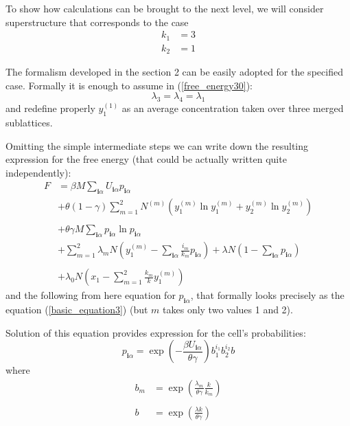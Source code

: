 \documentclass[12pt,abstract]{scrartcl}
\let\ce\ch
\begin{document}
To show how calculations can be brought to the next level, we will consider superstructure \ce{Cu3Au} that corresponds to the case
\begin{equation} \label{k1k2}
\begin{split}
	k_1 &= 3\\
	k_2 &= 1
\end{split}
\end{equation}

The formalism developed in the  section 2 can be easily adopted for the specified case. 
Formally it is enough to assume in (\ref{free_energy30}):
\begin{equation} 
\lambda_3 = \lambda_4 = \lambda_1
\end{equation}
and redefine properly $y_1^{(1)}$ as an average concentration taken over three merged sublattices.


Omitting the simple intermediate steps we can write down the resulting expression for the free energy (that could be actually written quite independently):
\begin{equation} \label{free_energy40}
\begin{split}
F &= \beta M \sum_{\mathbf{i}  \alpha}U_{\mathbf{i}  \alpha} p_{\mathbf{i}  \alpha}  \\
&+ \theta(1- \gamma) \sum_{m = 1}^2  N^{(m)} ( y_1^{(m)} \ln y_1^{(m)} + y_2^{(m)} \ln y_2^{(m)} )\\
\\
&+ \theta \gamma M \sum_{\mathbf{i}  \alpha} p_{\mathbf{i}  \alpha} \ln p_{\mathbf{i}  \alpha}\\
&+ \sum_{m=1}^2 \lambda_m N \left(y_1^{(m)} -  \sum_{\mathbf{i} \alpha} \frac{i_m}{k_m} p_{\mathbf{i} \alpha} \right) 
+ \lambda N \left(1- \sum_{\mathbf{i} \alpha}p_{\mathbf{i} \alpha}   \right)\\ 
\\
&+ \lambda_0 N \left(x_1 - \sum_{m=1}^2 \frac{k_m}{k} y_1^{(m)} \right)
\end{split}
\end{equation}
and the following from here equation for $p_{\mathbf{i}  \alpha}$, that formally looks precisely as the equation
(\ref{basic_equation3}) (but $m$ takes only two values 1 and 2).

Solution of this equation provides expression for the cell's probabilities:
\begin{equation} \label{pia4}
    p_{\mathbf{i} \alpha} = \exp \left(- \frac{ \beta U_{\mathbf{i}  \alpha} }{\theta\gamma }\right) 
b_1^{i_1} b_2^{i_2}  b
\end{equation}
where
\begin{equation} \label{bb5}
\begin{split}
b_m & = \exp \left( \frac{\lambda_m}{\theta \gamma} \frac{k}{k_m} \right)\\
\\
b & =  \exp \left( \frac{\lambda k}{\theta \gamma} \right)
\end{split}
\end{equation}
\end{document}
